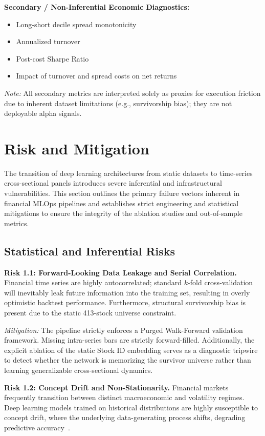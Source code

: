 \documentclass[twoside,final]{hcmut-report}
\begin{document}
\textbf{Secondary / Non-Inferential Economic Diagnostics:}
\begin{itemize}
    \item Long-short decile spread monotonicity
    \item Annualized turnover
    \item Post-cost Sharpe Ratio
    \item Impact of turnover and spread costs on net returns
\end{itemize}

\textit{Note:} All secondary metrics are interpreted solely as proxies for execution friction due to inherent dataset limitations (e.g., survivorship bias); they are not deployable alpha signals.

\section{Risk and Mitigation}

The transition of deep learning architectures from static datasets to time-series cross-sectional panels introduces severe inferential and infrastructural vulnerabilities. This section outlines the primary failure vectors inherent in financial MLOps pipelines and establishes strict engineering and statistical mitigations to ensure the integrity of the ablation studies and out-of-sample metrics.

\subsection{Statistical and Inferential Risks}

\textbf{Risk 1.1: Forward-Looking Data Leakage and Serial Correlation.} Financial time series are highly autocorrelated; standard $k$-fold cross-validation will inevitably leak future information into the training set, resulting in overly optimistic backtest performance. Furthermore, structural survivorship bias is present due to the static 413-stock universe constraint.

\textit{Mitigation:} The pipeline strictly enforces a Purged Walk-Forward validation framework. Missing intra-series bars are strictly forward-filled. Additionally, the explicit ablation of the static Stock ID embedding serves as a diagnostic tripwire to detect whether the network is memorizing the survivor universe rather than learning generalizable cross-sectional dynamics.

\textbf{Risk 1.2: Concept Drift and Non-Stationarity.} Financial markets frequently transition between distinct macroeconomic and volatility regimes. Deep learning models trained on historical distributions are highly susceptible to concept drift, where the underlying data-generating process shifts, degrading predictive accuracy~\cite{Dixon2020}.
\end{document}

